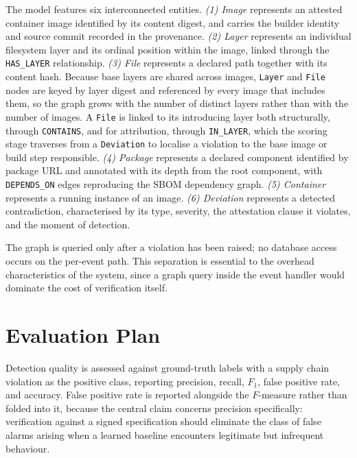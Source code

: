 \documentclass[conference]{IEEEtran}
\begin{document}
The model features six interconnected entities. \textit{(1) Image}
represents an attested container image identified by its content digest,
and carries the builder identity and source commit recorded in the
provenance. \textit{(2) Layer} represents an individual filesystem layer
and its ordinal position within the image, linked through the
\texttt{HAS\_LAYER} relationship. \textit{(3) File} represents a
declared path together with its content hash. Because base layers are
shared across images, \texttt{Layer} and \texttt{File} nodes are keyed
by layer digest and referenced by every image that includes them, so the
graph grows with the number of distinct layers rather than with the
number of images. A \texttt{File} is linked to its introducing layer
both structurally, through \texttt{CONTAINS}, and for attribution,
through \texttt{IN\_LAYER}, which the scoring stage traverses from a
\texttt{Deviation} to localise a violation to the base image or build
step responsible. \textit{(4) Package} represents a declared component
identified by package URL and annotated with its depth from the root
component, with \texttt{DEPENDS\_ON} edges reproducing the SBOM
dependency graph. \textit{(5) Container} represents a running instance
of an image. \textit{(6) Deviation} represents a detected contradiction,
characterised by its type, severity, the attestation clause it violates,
and the moment of detection.

The graph is queried only after a violation has been raised; no database
access occurs on the per-event path. This separation is essential to the
overhead characteristics of the system, since a graph query inside the
event handler would dominate the cost of verification itself.

\section{Evaluation Plan}

Detection quality is assessed against ground-truth labels with a supply
chain violation as the positive class, reporting precision, recall,
$F_1$, false positive rate, and accuracy. False positive rate is
reported alongside the $F$-measure rather than folded into it, because
the central claim concerns precision specifically: verification against
a signed specification should eliminate the class of false alarms
arising when a learned baseline encounters legitimate but infrequent
behaviour.
\end{document}
